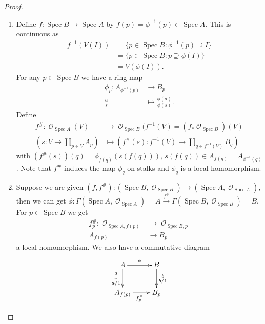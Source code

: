 \documentclass[10pt,]{book}
\theoremstyle{plain}
\theoremstyle{definition}
\numberwithin{equation}{section}
\DeclareMathOperator{\sO}{\mathcal{O}}
\DeclareMathOperator{\Spec}{Spec}
\begin{document}
\begin{proof}
\begin{enumerate}
\item{}
                Define \(f\colon \Spec B \to \Spec A\) by \(f(p) = \phi^{-1}(p) \in \Spec A\).
                This is continuous as
                \begin{align*}
f^{-1}(V(I)) &= \{p\in \Spec B : \phi^{-1}(p) \supseteq I\}\\
             &= \{p\in \Spec B : p \supseteq \phi(I)\}\\
             &= V(\phi(I)).
\end{align*}
                For any \(p\in \Spec B\) we have a ring map 
                \begin{align*}
\phi_p \colon A_{\phi^{-1} (p)} &\to B_p\\
\frac as &\mapsto \frac{\phi(a)}{\phi(s)}.
\end{align*}
                Define
                \begin{align*}
f^\# \colon \sO_{\Spec A}(V) &\to \sO_{\Spec B}(f^{-1}(V) = (f_*\sO_{\Spec B})(V)\\
\left(s\colon V \to \coprod_{p\in V}A_p\right)&\mapsto \left(f^\#(s)\colon f^{-1}(V) \to \coprod_{q\in f^{-1} (V)}B_q\right)
\end{align*}
                with \((f^\#(s))(q) = \phi_{f(q)}(s(f(q)))\), \(s(f(q)) \in A_{f(q)} = A_{\phi^{-1}(q)}\).
                Note that \(f^\#\) induces the map \(\phi_q\) on stalks and \(\phi_q\) is a local homomorphism.
              \item{}
                Suppose we are given \((f, f^\#)\colon (\Spec B, \sO_{\Spec B}) \to (\Spec A, \sO_{\Spec A})\), then we can get \(\phi\colon \Gamma(\Spec A, \sO_{\Spec A}) = A \xrightarrow{f^\#} \Gamma(\Spec B, \sO_{\Spec B}) = B\).
                For \(p\in \Spec B\) we get 
                \begin{align*}
f^\#_p \colon \sO_{\Spec A, f(p)} & \to \sO_{\Spec B, p}\\
A_{f(p)} &\to B_p
\end{align*}
                a local homomorphism.
                We also have a commutative diagram
                \[
                  \xymatrix{
                  A \ar[r]^{\phi} \ar[d]_{\substack{a\\\downarrow\\a/1}}& B \ar[d]^{\substack{b\\ b/1}}\\
                  A_{f(p)} \ar[r]_{f_p^\#} & B_p
                  }
                \]
              \end{enumerate}
\end{proof}
\typeout{************************************************}
\typeout{************************************************}
\end{document}
